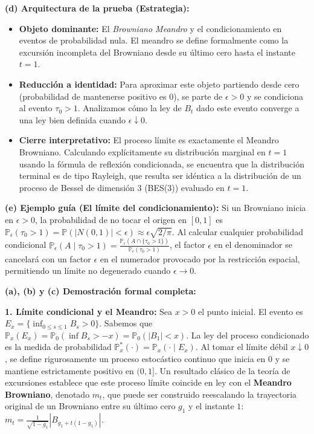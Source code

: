 \documentclass[11pt, letterpaper]{article}
\begin{document}
\begin{solucion}
    \textbf{(d) Arquitectura de la prueba (Estrategia):}
    \begin{itemize}
        \item[(i)] \textbf{Objeto dominante:} El \textit{Browniano Meandro} y el condicionamiento en eventos de probabilidad nula. El meandro se define formalmente como la excursión incompleta del Browniano desde su último cero hasta el instante $t=1$.
        \item[(ii)] \textbf{Reducción a identidad:} Para aproximar este objeto partiendo desde cero (probabilidad de mantenerse positivo es 0), se parte de $\epsilon > 0$ y se condiciona al evento $\tau_0 > 1$. Analizamos cómo la ley de $B_t$ dado este evento converge a una ley bien definida cuando $\epsilon \downarrow 0$.
        \item[(iii)] \textbf{Cierre interpretativo:} El proceso límite es exactamente el Meandro Browniano. Calculando explícitamente su distribución marginal en $t=1$ usando la fórmula de reflexión condicionada, se encuentra que la distribución terminal es de tipo Rayleigh, que resulta ser idéntica a la distribución de un proceso de Bessel de dimensión 3 (BES(3)) evaluado en $t=1$.
    \end{itemize}

    \vspace{3mm}
    \textbf{(e) Ejemplo guía (El límite del condicionamiento):}
    Si un Browniano inicia en $\epsilon > 0$, la probabilidad de no tocar el origen en $[0,1]$ es $\mathbb{P}_\epsilon(\tau_0 > 1) = \mathbb{P}(|N(0,1)| < \epsilon) \approx \epsilon \sqrt{2/\pi}$. Al calcular cualquier probabilidad condicional $\mathbb{P}_\epsilon(A \mid \tau_0 > 1) = \frac{\mathbb{P}_\epsilon(A \cap \{\tau_0 > 1\})}{\mathbb{P}_\epsilon(\tau_0 > 1)}$, el factor $\epsilon$ en el denominador se cancelará con un factor $\epsilon$ en el numerador provocado por la restricción espacial, permitiendo un límite no degenerado cuando $\epsilon \to 0$.

    \textbf{(a), (b) y (c) Demostración formal completa:}

    \textbf{1. Límite condicional y el Meandro:}
    Sea $x > 0$ el punto inicial. El evento es $E_x = \{\inf_{0 \le s \le 1} B_s > 0\}$. Sabemos que $\mathbb{P}_x(E_x) = \mathbb{P}_0(\inf B_s > -x) = \mathbb{P}_0(|B_1| < x)$.
    La ley del proceso condicionado es la medida de probabilidad $\mathbb{P}_x^*(\cdot) = \mathbb{P}_x(\cdot \mid E_x)$.
    Al tomar el límite débil $x \downarrow 0$, se define rigurosamente un proceso estocástico continuo que inicia en 0 y se mantiene estrictamente positivo en $(0, 1]$.
    Un resultado clásico de la teoría de excursiones establece que este proceso límite coincide en ley con el \textbf{Meandro Browniano}, denotado $m_t$, que puede ser construido reescalando la trayectoria original de un Browniano entre su último cero $g_1$ y el instante $1$: $m_t = \frac{1}{\sqrt{1-g_1}} |B_{g_1 + t(1-g_1)}|$.


\end{solucion}
\end{document}
